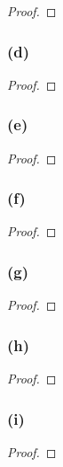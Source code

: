\documentclass[14pt]{extarticle}
\begin{document}
\begin{proof}

\end{proof}

\subsubsection{(d)}

\begin{proof}

\end{proof}

\subsubsection{(e)}

\begin{proof}

\end{proof}

\subsubsection{(f)}

\begin{proof}

\end{proof}

\subsubsection{(g)}

\begin{proof}

\end{proof}

\subsubsection{(h)}

\begin{proof}

\end{proof}

\subsubsection{(i)}

\begin{proof}

\end{proof}
\end{document}
